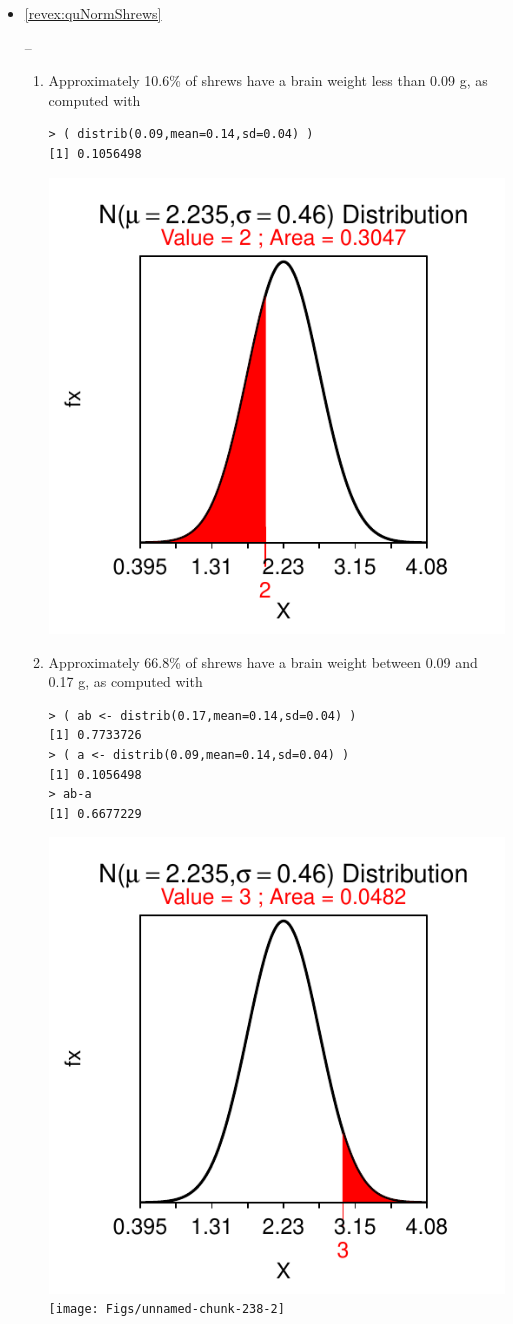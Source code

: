 \documentclass[10pt,openany]{book}\usepackage[]{graphicx}\usepackage[]{color}
\makeatletter
\newenvironment{kframe}{%
 \def\at@end@of@kframe{}%
 \ifinner\ifhmode%
  \def\at@end@of@kframe{\end{minipage}}%
  \begin{minipage}{\columnwidth}%
 \fi\fi%
 \def\FrameCommand##1{\hskip\@totalleftmargin \hskip-\fboxsep
 \colorbox{shadecolor}{##1}\hskip-\fboxsep
     \hskip-\linewidth \hskip-\@totalleftmargin \hskip\columnwidth}%
 \MakeFramed {\advance\hsize-\width
   \@totalleftmargin\z@ \linewidth\hsize
   \@setminipage}}%
 {\par\unskip\endMakeFramed%
 \at@end@of@kframe}
\newenvironment{knitrout}{}{} %
\makeatother
\begin{document}
\begin{itemize}
  \item \hypertarget{ans:quNormShrews}{\ref{revex:quNormShrews}} --
    \begin{enumerate}
      \item Approximately 10.6\% of shrews have a brain weight less than 0.09 g, as computed with
\begin{knitrout}
\color{fgcolor}\begin{kframe}
\begin{verbatim}
> ( distrib(0.09,mean=0.14,sd=0.04) )
[1] 0.1056498
\end{verbatim}
\end{kframe}

{\centering \includegraphics[width=.4\linewidth]{Figs/unnamed-chunk-237-1} 

}



\end{knitrout}
      \item Approximately 66.8\% of shrews have a brain weight between 0.09 and 0.17 g, as computed with
\begin{knitrout}
\color{fgcolor}\begin{kframe}
\begin{verbatim}
> ( ab <- distrib(0.17,mean=0.14,sd=0.04) )
[1] 0.7733726
> ( a <- distrib(0.09,mean=0.14,sd=0.04) )
[1] 0.1056498
> ab-a
[1] 0.6677229
\end{verbatim}
\end{kframe}

{\centering \includegraphics[width=.4\linewidth]{Figs/unnamed-chunk-238-1} 
\texttt{[image: Figs/unnamed-chunk-238-2]} 

}
\end{knitrout}
\end{enumerate}
\end{itemize}
\end{document}
